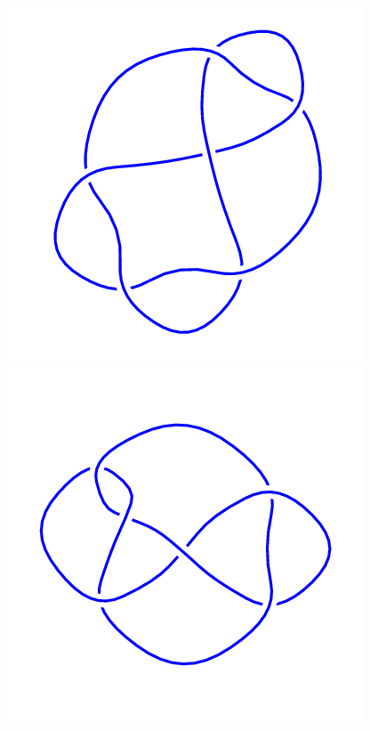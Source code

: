 \begin{figure}[H]
	\begin{minipage}[b]{.18\linewidth}
		\centering
		\includegraphics[width=\linewidth]{../data/6_2.png}
	\end{minipage}
	\begin{minipage}[b]{.18\linewidth}
		\centering
		\includegraphics[width=\linewidth]{../data/6_3.png}

\end{minipage}
\end{figure}
